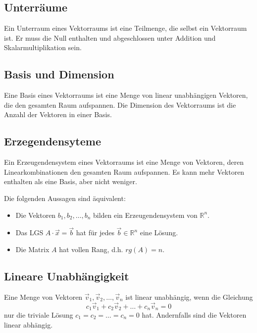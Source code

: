 \documentclass{article}
\begin{document}
\hfill
\begin{minipage}[t]{0.45\textwidth}
    \subsection*{Unterräume}
    Ein Unterraum eines Vektorraums ist eine Teilmenge, die selbst ein Vektorraum ist. Er muss die Null enthalten und abgeschlossen unter Addition und Skalarmultiplikation sein.
    
    \subsection*{Basis und Dimension}
    Eine Basis eines Vektorraums ist eine Menge von linear unabhängigen Vektoren, die den gesamten Raum aufspannen. Die Dimension des Vektorraums ist die Anzahl der Vektoren in einer Basis.

    \subsection*{Erzegendensyteme}
    Ein Erzeugendensystem eines Vektorraums ist eine Menge von Vektoren, deren Linearkombinationen den gesamten Raum aufspannen. Es kann mehr Vektoren enthalten als eine Basis, aber nicht weniger.
    
    Die folgenden Aussagen sind äquivalent:
    \begin{itemize}
        \item Die Vektoren $b_1, b_2, \ldots, b_n$ bilden ein Erzeugendensystem von $\mathbb{R}^n$.
        \item Das LGS $A \cdot \vec{x} = \vec{b}$ hat für jedes $\vec{b} \in \mathbb{R}^n$ eine Lösung.
        \item Die Matrix $A$ hat vollen Rang, d.h. $rg(A) = n$.
    \end{itemize}

    \subsection*{Lineare Unabhängigkeit}
    Eine Menge von Vektoren \( \vec{v}_1, \vec{v}_2, \ldots, \vec{v}_n \) ist linear unabhängig, wenn die Gleichung
    \begin{equation*}
        c_1 \vec{v}_1 + c_2 \vec{v}_2 + \ldots + c_n \vec{v}_n = 0
    \end{equation*}
    nur die triviale Lösung \( c_1 = c_2 = \ldots = c_n = 0 \) hat. Andernfalls sind die Vektoren linear abhängig.
\end{minipage}
\end{document}
